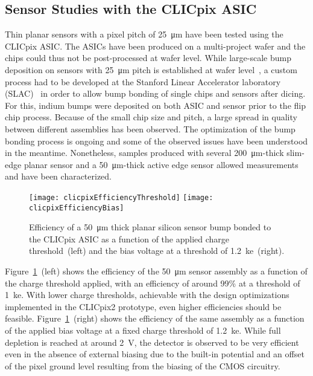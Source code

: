 \documentclass[a4paper,11pt]{article}
\begin{document}
\subsection{Sensor Studies with the CLICpix ASIC}

Thin planar sensors with a pixel pitch of \SI{25}{\um} have been tested using the CLICpix ASIC.
The ASICs have been produced on a multi-project wafer and the chips could thus not be post-processed at wafer level.
While large-scale bump deposition on sensors with \SI{25}{\um} pitch is established at wafer level~\cite{bumpbonds-moench}, a custom process had to be developed at the Stanford Linear Accelerator laboratory (SLAC)~\cite{bumpbonding} in order to allow bump bonding of single chips and sensors after dicing.
For this, indium bumps were deposited on both ASIC and sensor prior to the flip chip process.
Because of the small chip size and pitch, a large spread in quality between different assemblies has been observed.
The optimization of the bump bonding process is ongoing and some of the observed issues have been understood in the meantime.
Nonetheless, samples produced with several \SI{200}{\um}-thick slim-edge planar sensor and a \SI{50}{\um}-thick active edge sensor allowed measurements and have been characterized.

\begin{figure}[tbp]
  \center
  \texttt{[image: clicpixEfficiencyThreshold]}%
  \texttt{[image: clicpixEfficiencyBias]}
  \caption[Efficiency as a function of threshold and bias voltage]{Efficiency of a \SI{50}{\um} thick planar silicon sensor bump bonded to the CLICpix ASIC as a function of the applied charge threshold~(left) and the bias voltage at a threshold of \SI{1.2}{ke}~(right).}
  \label{fig:smallpitch}
\end{figure}

Figure~\ref{fig:smallpitch}~(left) shows the efficiency of the \SI{50}{\um} sensor assembly as a function of the charge threshold applied, with an efficiency of around 99\% at a threshold of \SI{1}{ke}.
With lower charge thresholds, achievable with the design optimizations implemented in the CLICpix2 prototype, even higher efficiencies should be feasible.
Figure~\ref{fig:smallpitch}~(right) shows the efficiency of the same assembly as a function of the applied bias voltage at a fixed charge threshold of \SI{1.2}{ke}.
While full depletion is reached at around \SI{2}{\V}, the detector is observed to be very efficient even in the absence of external biasing due to the built-in potential and an offset of the pixel ground level resulting from the biasing of the CMOS circuitry.
\end{document}
